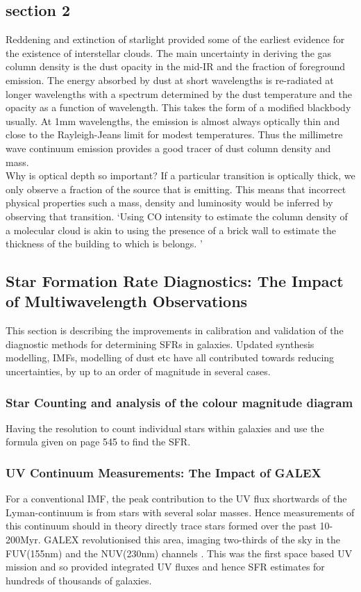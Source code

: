 \documentclass{literature}
\begin{document}
\subsection{section 2}
Reddening and extinction of starlight provided some of the earliest evidence for the existence of interstellar clouds. The main uncertainty in deriving the gas column density is the dust opacity in the mid-IR and the fraction of foreground emission. The energy absorbed by dust at short wavelengths is re-radiated at longer wavelengths with a spectrum determined by the dust temperature and the opacity as a function of wavelength. This takes the form of a modified blackbody usually. At 1mm wavelengths, the emission is almost always optically thin and close to the Rayleigh-Jeans limit for modest temperatures. Thus the millimetre wave continuum emission provides a good tracer of dust column density and mass. \\ 
Why is optical depth so important? If a particular transition is optically thick, we only observe a fraction of the source that is emitting. This means that incorrect physical properties such a mass, density and luminosity would be inferred by observing that transition. `Using CO intensity to estimate the column density of a molecular cloud is akin to using the presence of a brick wall to estimate the thickness of the building to which is belongs. ' 
\subsection{Star Formation Rate Diagnostics: The Impact of Multiwavelength Observations}
This section is describing the improvements in calibration and validation of the diagnostic methods for determining SFRs in galaxies. Updated synthesis modelling, IMFs, modelling of dust etc have all contributed towards reducing uncertainties, by up to an order of magnitude in several cases.
\subsubsection{Star Counting and analysis of the colour magnitude diagram}
Having the resolution to count individual stars within galaxies and use the formula given on page 545 to find the SFR. 
\subsubsection{UV Continuum Measurements: The Impact of GALEX}
For a conventional IMF, the peak contribution to the UV flux shortwards of the Lyman-continuum is from stars with several solar masses. Hence measurements of this continuum should in theory directly trace stars formed over the past 10-200Myr. GALEX revolutionised this area, imaging two-thirds of the sky in the FUV(155nm) and the NUV(230nm) channels \citep{Martin2005}. This was the first space based UV mission and so provided integrated UV fluxes and hence SFR estimates for hundreds of thousands of galaxies. 
\end{document}

